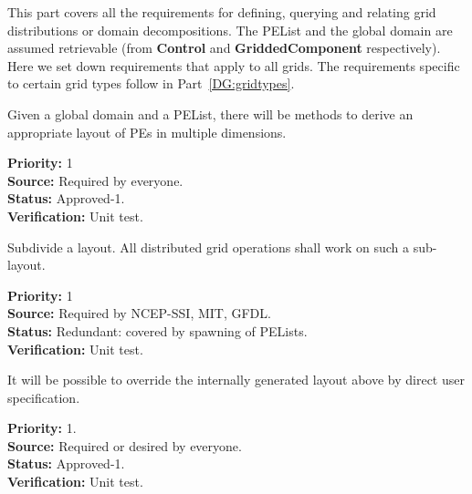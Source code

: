 %


This part covers all the requirements for defining, querying and
relating grid distributions or domain decompositions. The PEList and
the global domain are assumed retrievable (from \textbf{Control} and
\textbf{GriddedComponent} respectively). Here we set down requirements
that apply to all grids. The requirements specific to certain grid
types follow in Part~\ref{DG:gridtypes}.



Given a global domain and a PEList, there will be methods to derive an
appropriate layout of PEs in multiple dimensions.

\begin{reqlist}
{\bf Priority:} 1\\
{\bf Source:} Required by everyone. \\
{\bf Status:} Approved-1. \\
{\bf Verification:} Unit test.
\end{reqlist}


Subdivide a layout.  All distributed grid operations shall work 
on such a sub-layout.

\begin{reqlist}
{\bf Priority:} 1 \\
{\bf Source:} Required by NCEP-SSI, MIT, GFDL. \\
{\bf Status:} Redundant: covered by spawning of PELists. \\
{\bf Verification:} Unit test.
\end{reqlist}


It will be possible to override the internally generated layout above
by direct user specification.

\begin{reqlist}
{\bf Priority:} 1. \\ 
{\bf Source:} Required or desired by everyone. \\
{\bf Status:} Approved-1. \\
{\bf Verification:} Unit test.
\end{reqlist}

